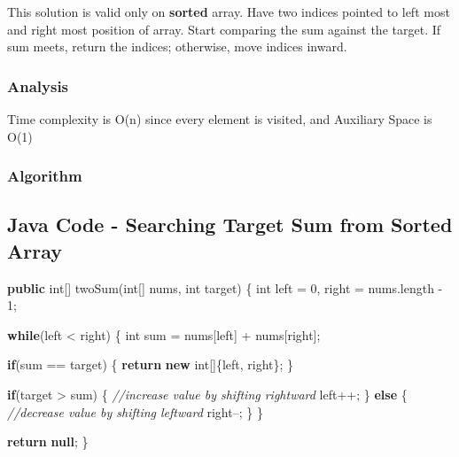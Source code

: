 \documentclass[]{book}
\newenvironment{Shaded}{\begin{snugshade}}{\end{snugshade}}
\newcommand{\CommentTok}[1]{\textcolor[rgb]{0.56,0.35,0.01}{\textit{#1}}}
\newcommand{\DataTypeTok}[1]{\textcolor[rgb]{0.13,0.29,0.53}{#1}}
\newcommand{\DecValTok}[1]{\textcolor[rgb]{0.00,0.00,0.81}{#1}}
\newcommand{\FunctionTok}[1]{\textcolor[rgb]{0.00,0.00,0.00}{#1}}
\newcommand{\KeywordTok}[1]{\textcolor[rgb]{0.13,0.29,0.53}{\textbf{#1}}}
\newcommand{\NormalTok}[1]{#1}
\begin{document}
This solution is valid only on \textbf{sorted} array. Have two indices pointed to left most and right most position
of array. Start comparing the sum against the target. If sum meets, return the indices; otherwise, move indices
inward.

\hypertarget{analysis-2}{%
\subsubsection{Analysis}\label{analysis-2}}

Time complexity is O(n) since every element is visited, and Auxiliary Space is O(1)

\hypertarget{algorithm-2}{%
\subsubsection{Algorithm}\label{algorithm-2}}

\hypertarget{java-code---searching-target-sum-from-sorted-array}{%
\subsection{Java Code - Searching Target Sum from Sorted Array}\label{java-code---searching-target-sum-from-sorted-array}}

\begin{Shaded}
\begin{Highlighting}[]
\KeywordTok{public} \DataTypeTok{int}\NormalTok{[] }\FunctionTok{twoSum}\NormalTok{(}\DataTypeTok{int}\NormalTok{[] nums, }\DataTypeTok{int}\NormalTok{ target) \{}
    \DataTypeTok{int}\NormalTok{ left = }\DecValTok{0}\NormalTok{, right = nums.}\FunctionTok{length}\NormalTok{ - }\DecValTok{1}\NormalTok{;}

    \KeywordTok{while}\NormalTok{(left < right) \{}
        \DataTypeTok{int}\NormalTok{ sum = nums[left] + nums[right];}

        \KeywordTok{if}\NormalTok{(sum == target) \{}
            \KeywordTok{return} \KeywordTok{new} \DataTypeTok{int}\NormalTok{[]\{left, right\};}
\NormalTok{        \}}

        \KeywordTok{if}\NormalTok{(target > sum) \{}
            \CommentTok{//increase value by shifting rightward}
\NormalTok{            left++;}
\NormalTok{        \} }\KeywordTok{else}\NormalTok{ \{}
            \CommentTok{//decrease value by shifting leftward}
\NormalTok{            right--;}
\NormalTok{        \}}
\NormalTok{    \}}

    \KeywordTok{return} \KeywordTok{null}\NormalTok{;}
\NormalTok{\}}
\end{Highlighting}
\end{Shaded}
\end{document}
